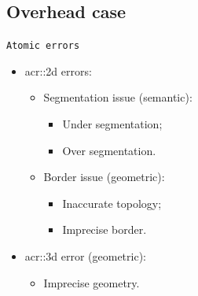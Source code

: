 \documentclass[12pt]{beamer}
\begin{document}
        \subsection{Overhead case}
            \begin{frame}{\texttt{Atomic errors}}
                \begin{itemize}[label=\(\blacktriangleright\), font=\color{IGNGreen}]
                    \item<1-> \Acrfull{acr::2d} errors:
                        \begin{itemize}[label=\(\blacktriangleright\), font=\color{IGNGreen}]
                            \item<only@2-6> Segmentation issue (semantic):
                                \begin{itemize}
                                    \item<only@3-4> Under segmentation;
                                    \item<only@5-6> Over segmentation.      
                                \end{itemize}
                            \item<only@7-11> Border issue (geometric):
                            \begin{itemize}
                                \item<only@8-9> Inaccurate topology;
                                \item<only@10-11> Imprecise border.      
                            \end{itemize}
                        \end{itemize}
                    \item<only@12-> \gls{acr::3d} error (geometric):
                        \begin{itemize}[label=\(\blacktriangleright\), font=\color{IGNGreen}]
                            \item<only@13-> Imprecise geometry.
                        \end{itemize}
                \end{itemize}
                \begin{overlayarea}{\textwidth}{.5\textheight}
\end{overlayarea}
\end{frame}
\end{document}
